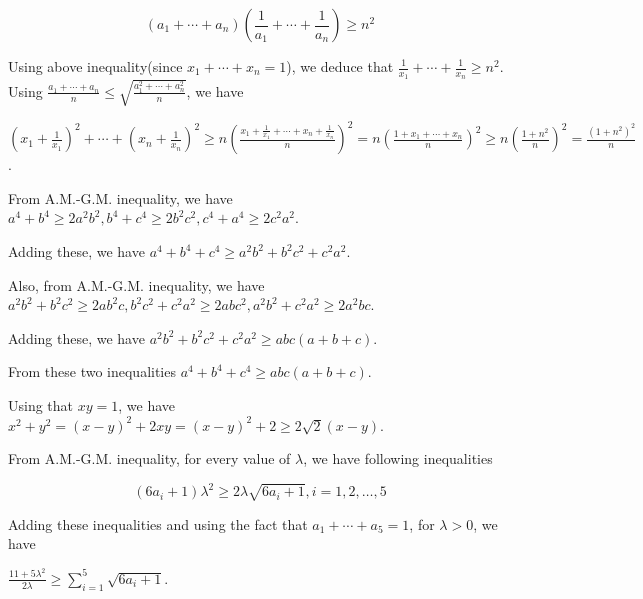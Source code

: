   $$(a_1 + \cdots + a_n)\left(\frac{1}{a_1} + \cdots + \frac{1}{a_n}\right)\geq n^2$$

  Using above inequality(since $x_1 + \cdots + x_n = 1$), we deduce that $\frac{1}{x_1} + \cdots +
  \frac{1}{x_n} \geq n^2$. Using $\frac{a_1 + \cdots + a_n}{n}\leq \sqrt{\frac{a_1^2 + \cdots + a_n^2}{n}}$,
  we have

  $\left(x_1 + \frac{1}{x_1}\right)^2 + \cdots + \left(x_n + \frac{1}{x_n}\right)^2\geq n\left(\frac{x_1 +
    \frac{1}{x_1} + \cdots + x_n + \frac{1}{x_n}}{n}\right)^2 = n\left(\frac{1 + x_1 + \cdots +
    x_n}{n}\right)^2\geq n\left(\frac{1 + n^2}{n}\right)^2 = \frac{(1 + n^2)^2}{n}$.
\item From A.M.-G.M. inequality, we have $a^4 + b^4\geq 2a^2b^2, b^4 + c^4\geq 2b^2c^2, c^4 + a^4\geq
  2c^2a^2$.

  Adding these, we have $a^4 + b^4 + c^4 \geq a^2b^2 + b^2c^2 + c^2a^2$.

  Also, from A.M.-G.M. inequality, we have $a^2b^2 + b^2c^2\geq 2ab^2c, b^2c^2 + c^2a^2\geq 2abc^2, a^2b^2 +
  c^2a^2\geq 2a^2bc$.

  Adding these, we have $a^2b^2 + b^2c^2 + c^2a^2\geq abc(a + b + c)$.

  From these two inequalities $a^4 + b^4 + c^4\geq abc(a + b + c)$.
\item Using that $xy = 1$, we have $x^2 + y^2 = (x - y)^2 + 2xy = (x - y)^2 + 2\geq 2\sqrt{2}(x - y)$.
\item From A.M.-G.M. inequality, for every value of $\lambda$, we have following inequalities

  $$(6a_i + 1)\lambda^2\geq 2\lambda\sqrt{6a_i + 1}, i = 1, 2, \ldots, 5$$

  Adding these inequalities and using the fact that $a_1 + \cdots + a_5 = 1$, for $\lambda > 0$, we have

  $\frac{11 + 5\lambda^2}{2\lambda}\geq \displaystyle\sum_{i = 1}^5\sqrt{6a_i + 1}$.

